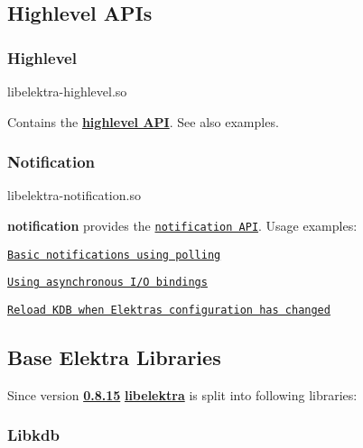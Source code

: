 \subsection*{Highlevel A\+P\+Is}

\subsubsection*{Highlevel}


\begin{DoxyCode}
libelektra-highlevel.so
\end{DoxyCode}


Contains the {\bfseries \hyperlink{src_libs_highlevel_README_md}{highlevel A\+PI}}. See also examples.

\subsubsection*{Notification}


\begin{DoxyCode}
libelektra-notification.so
\end{DoxyCode}


{\bfseries notification} provides the \href{https://doc.libelektra.org/api/current/html/group__kdbnotification.html}{\tt notification A\+PI}. Usage examples\+:


\begin{DoxyItemize}
\item \href{https://www.libelektra.org/examples/notificationpolling}{\tt Basic notifications using polling}
\item \href{https://www.libelektra.org/examples/notificationasync}{\tt Using asynchronous I/O bindings}
\item \href{https://www.libelektra.org/examples/notificationreload}{\tt Reload K\+DB when Elektra\textquotesingle{}s configuration has changed}
\end{DoxyItemize}

\subsection*{Base Elektra Libraries}

Since version {\bfseries \hyperlink{doc_decisions_library_split_md}{0.8.15}} {\bfseries \hyperlink{md_src_libs_elektra_README_src_libs_elektra_README_md}{libelektra}} is split into following libraries\+:

 \subsubsection*{Libkdb}


